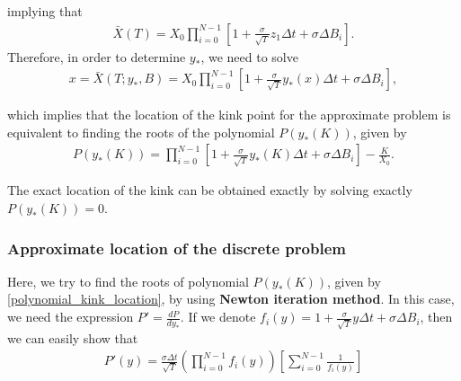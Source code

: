 \documentclass[11pt]{article}
\begin{document}
implying that
\begin{align}
	\bar{X}(T)=X_0 \prod_{i=0}^{N-1} \left[ 1+\frac{\sigma}{\sqrt{T}} z_1 \Delta t+ \sigma \Delta B_{i}\right].
\end{align}
Therefore, in order to determine $y_{\ast}$, we need to solve
\begin{align}
	x=\bar{X}(T;y_{\ast},B)=X_0 \prod_{i=0}^{N-1} \left[ 1+\frac{\sigma}{\sqrt{T}} y_{\ast}(x) \Delta t+ \sigma \Delta B_{i}\right],
\end{align}

which implies that the location of the kink point for the approximate problem is equivalent to finding the roots of the polynomial $P(y_\ast(K))$, given by
\begin{align}\label{polynomial_kink_location}
	P(y_{\ast}(K))=\prod_{i=0}^{N-1} \left[ 1+\frac{\sigma}{\sqrt{T}} y_\ast(K) \Delta t+ \sigma \Delta B_{i}\right]-\frac{K}{X_0}.
\end{align}

The exact location of the kink can be obtained exactly by solving exactly $P(y_{\ast}(K))=0$.

\subsubsection*{Approximate location of the discrete problem}

Here, we try to  find the roots of polynomial $P(y_{\ast}(K))$, given by \eqref{polynomial_kink_location}, by using \textbf{Newton iteration method}. In this case, we need the expression $P'=\frac{d P}{d y_\ast}$. If we denote $f_i(y)=1+\frac{\sigma}{\sqrt{T}} y \Delta t+ \sigma \Delta B_{i}$, then we can easily show that
\begin{align}\label{polynomial_kink_location_derivative}
	P'(y)=\frac{\sigma \Delta t}{\sqrt{T}} \left( \prod_{i=0}^{N-1} f_i(y)\right) \left[ \sum_{i=0}^{N-1} \frac{1}{f_i(y)}\right]
\end{align}

 
\end{document}
